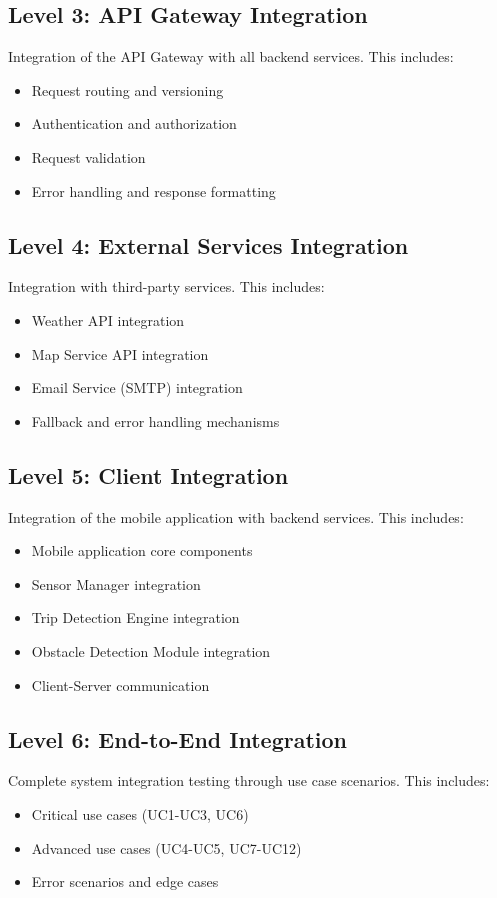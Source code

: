\subsection{Level 3: API Gateway Integration}
\label{subsec:level3_api_gateway}%
Integration of the API Gateway with all backend services. This includes:
\begin{itemize}
    \item Request routing and versioning
    \item Authentication and authorization
    \item Request validation
    \item Error handling and response formatting
\end{itemize}

\subsection{Level 4: External Services Integration}
\label{subsec:level4_external_services}%
Integration with third-party services. This includes:
\begin{itemize}
    \item Weather API integration
    \item Map Service API integration
    \item Email Service (SMTP) integration
    \item Fallback and error handling mechanisms
\end{itemize}

\subsection{Level 5: Client Integration}
\label{subsec:level5_client_integration}%
Integration of the mobile application with backend services. This includes:
\begin{itemize}
    \item Mobile application core components
    \item Sensor Manager integration
    \item Trip Detection Engine integration
    \item Obstacle Detection Module integration
    \item Client-Server communication
\end{itemize}

\subsection{Level 6: End-to-End Integration}
\label{subsec:level6_e2e_integration}%
Complete system integration testing through use case scenarios. This includes:
\begin{itemize}
    \item Critical use cases (UC1-UC3, UC6)
    \item Advanced use cases (UC4-UC5, UC7-UC12)
    \item Error scenarios and edge cases
\end{itemize}

